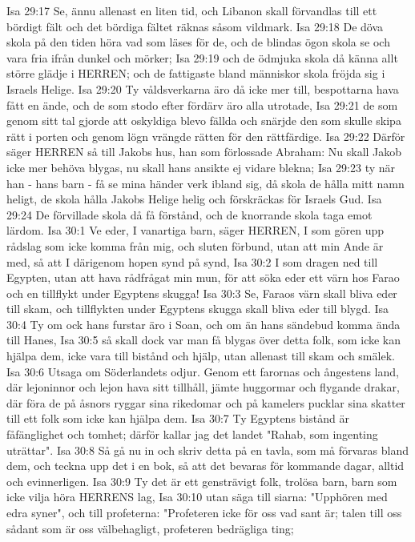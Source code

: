 Isa 29:17  Se, ännu allenast en liten tid, och Libanon skall förvandlas till ett bördigt fält och det bördiga fältet räknas såsom vildmark.
Isa 29:18  De döva skola på den tiden höra vad som läses för de, och de blindas ögon skola se och vara fria ifrån dunkel och mörker;
Isa 29:19  och de ödmjuka skola då känna allt större glädje i HERREN; och de fattigaste bland människor skola fröjda sig i Israels Helige.
Isa 29:20  Ty våldsverkarna äro då icke mer till, bespottarna hava fått en ände, och de som stodo efter fördärv äro alla utrotade,
Isa 29:21  de som genom sitt tal gjorde att oskyldiga blevo fällda och snärjde den som skulle skipa rätt i porten och genom lögn vrängde rätten för den rättfärdige.
Isa 29:22  Därför säger HERREN så till Jakobs hus, han som förlossade Abraham: Nu skall Jakob icke mer behöva blygas, nu skall hans ansikte ej vidare blekna;
Isa 29:23  ty när han - hans barn - få se mina händer verk ibland sig, då skola de hålla mitt namn heligt, de skola hålla Jakobs Helige helig och förskräckas för Israels Gud.
Isa 29:24  De förvillade skola då få förstånd, och de knorrande skola taga emot lärdom.
Isa 30:1  Ve eder, I vanartiga barn, säger HERREN, I som gören upp rådslag som icke komma från mig, och sluten förbund, utan att min Ande är med, så att I därigenom hopen synd på synd,
Isa 30:2  I som dragen ned till Egypten, utan att hava rådfrågat min mun, för att söka eder ett värn hos Farao och en tillflykt under Egyptens skugga!
Isa 30:3  Se, Faraos värn skall bliva eder till skam, och tillflykten under Egyptens skugga skall bliva eder till blygd.
Isa 30:4  Ty om ock hans furstar äro i Soan, och om än hans sändebud komma ända till Hanes,
Isa 30:5  så skall dock var man få blygas över detta folk, som icke kan hjälpa dem, icke vara till bistånd och hjälp, utan allenast till skam och smälek.
Isa 30:6  Utsaga om Söderlandets odjur. Genom ett farornas och ångestens land, där lejoninnor och lejon hava sitt tillhåll, jämte huggormar och flygande drakar, där föra de på åsnors ryggar sina rikedomar och på kamelers pucklar sina skatter till ett folk som icke kan hjälpa dem.
Isa 30:7  Ty Egyptens bistånd är fåfänglighet och tomhet; därför kallar jag det landet "Rahab, som ingenting uträttar".
Isa 30:8  Så gå nu in och skriv detta på en tavla, som må förvaras bland dem, och teckna upp det i en bok, så att det bevaras för kommande dagar, alltid och evinnerligen.
Isa 30:9  Ty det är ett gensträvigt folk, trolösa barn, barn som icke vilja höra HERRENS lag,
Isa 30:10  utan säga till siarna: "Upphören med edra syner", och till profeterna: "Profeteren icke för oss vad sant är; talen till oss sådant som är oss välbehagligt, profeteren bedrägliga ting;
